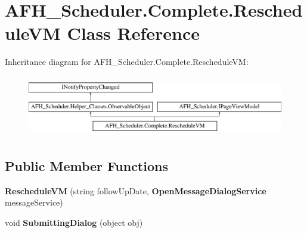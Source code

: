\section{A\+F\+H\+\_\+\+Scheduler.\+Complete.\+Reschedule\+VM Class Reference}
\label{class_a_f_h___scheduler_1_1_complete_1_1_reschedule_v_m}
Inheritance diagram for A\+F\+H\+\_\+\+Scheduler.\+Complete.\+Reschedule\+VM\+:\begin{figure}[H]
\begin{center}
\leavevmode
\includegraphics[height=2.700965cm]{class_a_f_h___scheduler_1_1_complete_1_1_reschedule_v_m}
\end{center}
\end{figure}
\subsection*{Public Member Functions}
\begin{DoxyCompactItemize}
\item 
\mbox{\label{class_a_f_h___scheduler_1_1_complete_1_1_reschedule_v_m_a0db67820ecad13ab498398ebf63ef3cd}} 
{\bfseries Reschedule\+VM} (string follow\+Up\+Date, \textbf{ Open\+Message\+Dialog\+Service} message\+Service)
\item 
\mbox{\label{class_a_f_h___scheduler_1_1_complete_1_1_reschedule_v_m_a8e5509483bc14a2ceec5063b6fceff9a}} 
void {\bfseries Submitting\+Dialog} (object obj)
\end{DoxyCompactItemize}
